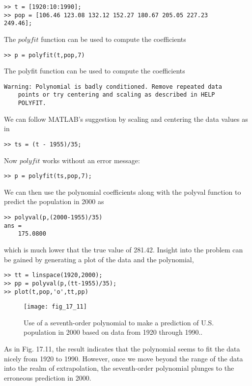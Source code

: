 \documentclass[../main.tex]{subfiles}
\begin{document}
\begin{exmp}
        \begin{lstlisting}[numbers=none]
>> t = [1920:10:1990];
>> pop = [106.46 123.08 132.12 152.27 180.67 205.05 227.23
249.46];
        \end{lstlisting}
        The $polyfit$ function can be used to compute the coefficients
        \begin{lstlisting}[numbers=none]
>> p = polyfit(t,pop,7)
        \end{lstlisting}
The polyfit function can be used to compute the coefficients
        \begin{lstlisting}[numbers=none]
Warning: Polynomial is badly conditioned. Remove repeated data
    points or try centering and scaling as described in HELP
    POLYFIT.
        \end{lstlisting}
        We can follow MATLAB's suggestion by scaling and centering the data values as in
        \begin{lstlisting}[numbers=none]
>> ts = (t - 1955)/35;
        \end{lstlisting}
        Now $polyfit$ works without an error message:
        \begin{lstlisting}[numbers=none]
>> p = polyfit(ts,pop,7);
        \end{lstlisting}
        We can then use the polynomial coefficients along with the polyval function to predict
the population in 2000 as
        \begin{lstlisting}[numbers=none]
>> polyval(p,(2000-1955)/35)
ans =
    175.0800
        \end{lstlisting}
        which is much lower that the true value of 281.42. Insight into the problem can be gained
by generating a plot of the data and the polynomial,
        \begin{lstlisting}[numbers=none]
>> tt = linspace(1920,2000);
>> pp = polyval(p,(tt-1955)/35);
>> plot(t,pop,'o',tt,pp)
        \end{lstlisting}

        \begin{figure}[H]
            \centering
            \texttt{[image: fig\_17\_11]}
           \caption{\textsf{Use of a seventh-order polynomial to make a prediction of U.S. population in 2000 based on
data from 1920 through 1990..}}\label{fig:fig_17_11}
        \end{figure}
        As in Fig. 17.11, the result indicates that the polynomial seems to fit the data nicely
        from 1920 to 1990. However, once we move beyond the range of the data into the realm of
        extrapolation, the seventh-order polynomial plunges to the erroneous prediction in 2000.
    \end{exmp}
\end{document}
